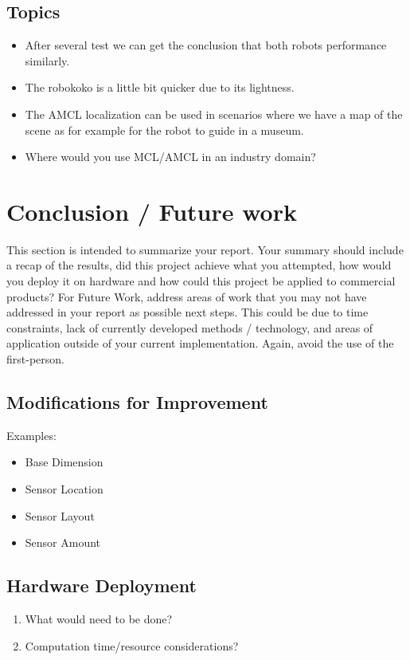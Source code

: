 \documentclass[10pt,journal,compsoc]{IEEEtran}
\begin{document}
\subsection{Topics}

\begin{itemize}
\item After several test we can get the conclusion that both robots performance similarly.
\item The robokoko is a little bit quicker due to its lightness.
\item The AMCL localization can be used in scenarios where we have a map of the scene as for example for the robot to guide in a museum.
\item Where would you use MCL/AMCL in an industry domain?
\end{itemize}

\section{Conclusion / Future work}
This section is intended to summarize your report. Your summary should include a recap of the results, did this project achieve what you attempted, how would you deploy it on hardware and how could this project be applied to commercial products? 
For Future Work, address areas of work that you may not have addressed in your report as possible next steps. This could be due to time constraints, lack of currently developed methods / technology, and areas of application outside of your current implementation. Again, avoid the use of the first-person.

\subsection{Modifications for Improvement}
Examples:

\begin{itemize}
\item Base Dimension
\item Sensor Location
\item Sensor Layout
\item Sensor Amount
\end{itemize}

\subsection{Hardware Deployment}

\begin{enumerate}
\item What would need to be done?
\item Computation time/resource considerations?
\end{enumerate}
\end{document}
